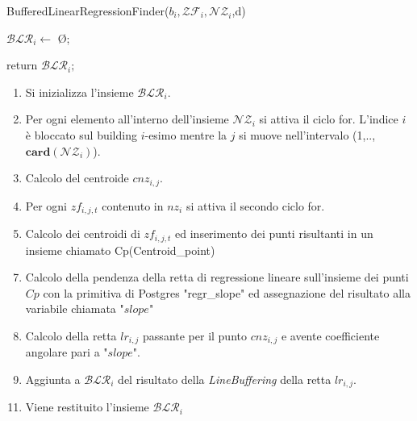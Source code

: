 \begin{algorithm}[H]
	
	\IncMargin{1em}
	\caption{BufferedLinearRegressionFinder($b_i , \mathcal{ZF}_i , \mathcal{NZ}_i$,d)}
	\label{alg:four}
	\BlankLine
	\SetAlgoNoLine
	$\mathcal{BLR}_i \leftarrow$ \O ;\\
	
	return $\mathcal{BLR}_i;$
	
\end{algorithm}

\begin{enumerate}
	\item Si inizializza l'insieme $\mathcal{BLR}_i$.
	\item Per ogni elemento all'interno dell'insieme $\mathcal{NZ}_i$ si attiva il ciclo for. L'indice $i$ è bloccato sul building $i$-esimo mentre la $j$ si muove nell'intervalo (1,..,$\mathbf{card}(\mathcal{NZ}_i)$).
	\item Calcolo del centroide $cnz_{i,j}$.
	\item Per ogni $zf_{i,j,t}$ contenuto in $nz_i$ si attiva il secondo ciclo for. 
	\item Calcolo dei centroidi di $zf_{i,j,t}$ ed inserimento dei punti risultanti in un insieme chiamato Cp(Centroid\_point)
\end{enumerate}
\begin{enumerate}
	\setcounter{enumi}{6}
	\item Calcolo della pendenza della retta di regressione lineare sull'insieme dei punti $Cp$ con la primitiva di Postgres "regr\_slope" ed assegnazione del risultato alla variabile chiamata "$slope$"
	\item Calcolo della retta $lr_{i,j}$ passante per il punto $cnz_{i,j}$ e avente coefficiente angolare pari a "$slope$".
	\item Aggiunta a $\mathcal{BLR}_i$ del risultato della \textit{LineBuffering} della retta $lr_{i,j}$.
\end{enumerate}
\begin{enumerate}
	\setcounter{enumi}{10}
	\item Viene restituito l'insieme $\mathcal{BLR}_i$
\end{enumerate}


